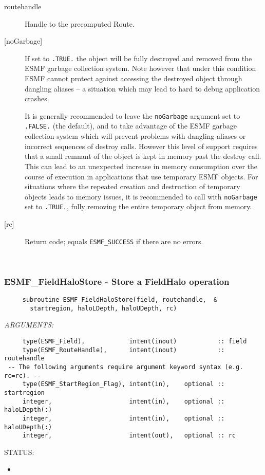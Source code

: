      \begin{description}
     \item [routehandle]
       Handle to the precomputed Route.
     \item[{[noGarbage]}]
       If set to {\tt .TRUE.} the object will be fully destroyed and removed
       from the ESMF garbage collection system. Note however that under this 
       condition ESMF cannot protect against accessing the destroyed object 
       through dangling aliases -- a situation which may lead to hard to debug 
       application crashes.
   
       It is generally recommended to leave the {\tt noGarbage} argument
       set to {\tt .FALSE.} (the default), and to take advantage of the ESMF 
       garbage collection system which will prevent problems with dangling
       aliases or incorrect sequences of destroy calls. However this level of
       support requires that a small remnant of the object is kept in memory
       past the destroy call. This can lead to an unexpected increase in memory
       consumption over the course of execution in applications that use 
       temporary ESMF objects. For situations where the repeated creation and 
       destruction of temporary objects leads to memory issues, it is 
       recommended to call with {\tt noGarbage} set to {\tt .TRUE.}, fully 
       removing the entire temporary object from memory.
     \item [{[rc]}]
       Return code; equals {\tt ESMF\_SUCCESS} if there are no errors.
     \end{description}
   
 
\mbox{}\hrulefill\ 
 
\subsubsection [ESMF\_FieldHaloStore] {ESMF\_FieldHaloStore - Store a FieldHalo operation}


  
\begin{verbatim}     subroutine ESMF_FieldHaloStore(field, routehandle,  &
       startregion, haloLDepth, haloUDepth, rc)\end{verbatim}{\em ARGUMENTS:}
\begin{verbatim}     type(ESMF_Field),            intent(inout)           :: field
     type(ESMF_RouteHandle),      intent(inout)           :: routehandle
 -- The following arguments require argument keyword syntax (e.g. rc=rc). --
     type(ESMF_StartRegion_Flag), intent(in),    optional :: startregion
     integer,                     intent(in),    optional :: haloLDepth(:)
     integer,                     intent(in),    optional :: haloUDepth(:)
     integer,                     intent(out),   optional :: rc\end{verbatim}
{\sf STATUS:}
   \begin{itemize}
   \item{}
   \end{itemize}
  
